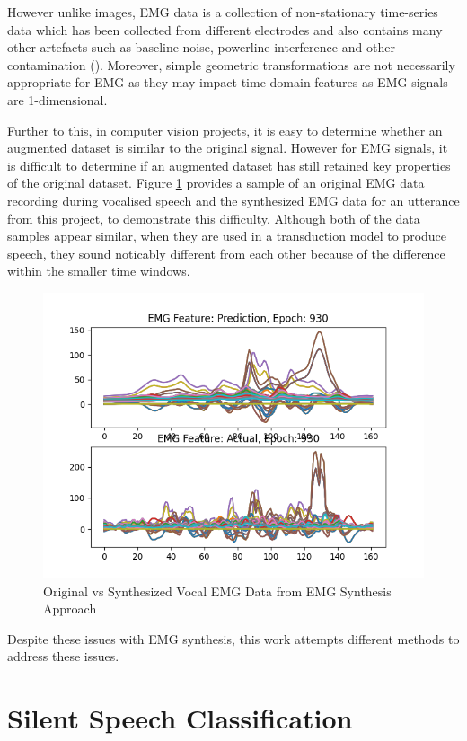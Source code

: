 However unlike images, EMG data is a collection of non-stationary
time-series data which has been collected from different electrodes
and also contains many other artefacts such as baseline noise,
powerline interference and other contamination (\cite{semg_filtering}).
Moreover, simple geometric transformations are not necessarily appropriate
for EMG as they may impact time domain features as EMG signals are
1-dimensional.

Further to this, in computer vision projects, it is easy to determine whether
an augmented dataset is similar to the original signal. However for EMG
signals, it is difficult to determine if an augmented dataset has still
retained key properties of the original dataset.
Figure \ref{fig:real-vs-pred-emg} provides a sample of an original
EMG data recording during vocalised speech and the synthesized EMG
data for an utterance from this project, to demonstrate this difficulty.
Although both of the data samples appear similar, when they are used in
a transduction model to produce speech, they sound noticably different from
each other because of the difference within the smaller time windows.

\begin{figure}[hbtp]
    \caption{Original vs Synthesized Vocal EMG Data from EMG Synthesis Approach}
    \label{fig:real-vs-pred-emg}
    \centering
    \includegraphics[width=0.75\linewidth]{graphics/emg_augment/real_vs_synth.png}
\end{figure}

Despite these issues with EMG synthesis, this work attempts different
methods to address these issues.

\section{Silent Speech Classification}

